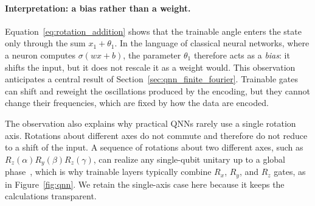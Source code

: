 \documentclass[12pt]{article}
\numberwithin{equation}{section}  %
\begin{document}
\paragraph{Interpretation: a bias rather than a weight.} Equation~\eqref{eq:rotation_addition} shows that the trainable angle enters the state only through the sum $x_1 + \theta_1$. In the language of classical neural networks, where a neuron computes $\sigma(wx + b)$, the parameter $\theta_1$ therefore acts as a \emph{bias}: it shifts the input, but it does not rescale it as a weight would. This observation anticipates a central result of Section~\ref{sec:qnn_finite_fourier}. Trainable gates can shift and reweight the oscillations produced by the encoding, but they cannot change their frequencies, which are fixed by how the data are encoded.

The observation also explains why practical QNNs rarely use a single rotation axis. Rotations about different axes do not commute and therefore do not reduce to a shift of the input. A sequence of rotations about two different axes, such as $R_z(\alpha) R_y(\beta) R_z(\gamma)$, can realize any single-qubit unitary up to a global phase~\cite[Sec.~4.2]{nielsen2010quantum}, which is why trainable layers typically combine $R_x$, $R_y$, and $R_z$ gates, as in Figure~\ref{fig:qnn}. We retain the single-axis case here because it keeps the calculations transparent.
\end{document}

